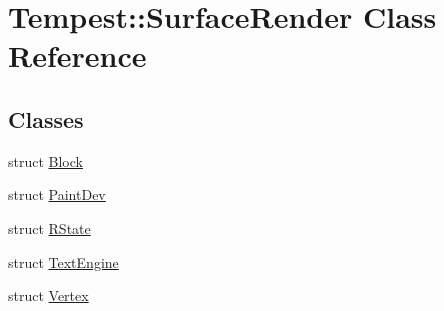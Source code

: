 \hypertarget{class_tempest_1_1_surface_render}{\section{Tempest\+:\+:Surface\+Render Class Reference}
\label{class_tempest_1_1_surface_render}
}
\subsection*{Classes}
\begin{DoxyCompactItemize}
\item 
struct \hyperlink{struct_tempest_1_1_surface_render_1_1_block}{Block}
\item 
struct \hyperlink{struct_tempest_1_1_surface_render_1_1_paint_dev}{Paint\+Dev}
\item 
struct \hyperlink{struct_tempest_1_1_surface_render_1_1_r_state}{R\+State}
\item 
struct \hyperlink{struct_tempest_1_1_surface_render_1_1_text_engine}{Text\+Engine}
\item 
struct \hyperlink{struct_tempest_1_1_surface_render_1_1_vertex}{Vertex}
\end{DoxyCompactItemize}
